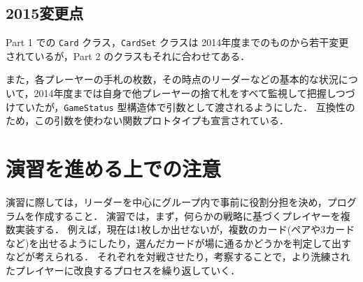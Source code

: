 \subsection*{2015変更点}
Part 1 での \verb+Card+ クラス，\verb+CardSet+ クラスは 2014年度までのものから若干変更されているが，Part 2 のクラスもそれに合わせてある．

また，各プレーヤーの手札の枚数，その時点のリーダーなどの基本的な状況について，2014年度までは自身で他プレーヤーの捨て札をすべて監視して把握しつづけていたが，\verb+GameStatus+ 型構造体で引数として渡されるようにした．
互換性のため，この引数を使わない関数プロトタイプも宣言されている．

\section*{演習を進める上での注意}
演習に際しては，リーダーを中心にグループ内で事前に役割分担を決め，プログラムを作成すること．
演習では，まず，何らかの戦略に基づくプレイヤーを複数実装する．
例えば，現在は1枚しか出せないが，複数のカード(ペアや3カードなど)を出せるようにしたり，選んだカードが場に通るかどうかを判定して出すなどが考えられる．
それぞれを対戦させたり，考察することで，より洗練されたプレイヤーに改良するプロセスを繰り返していく．

